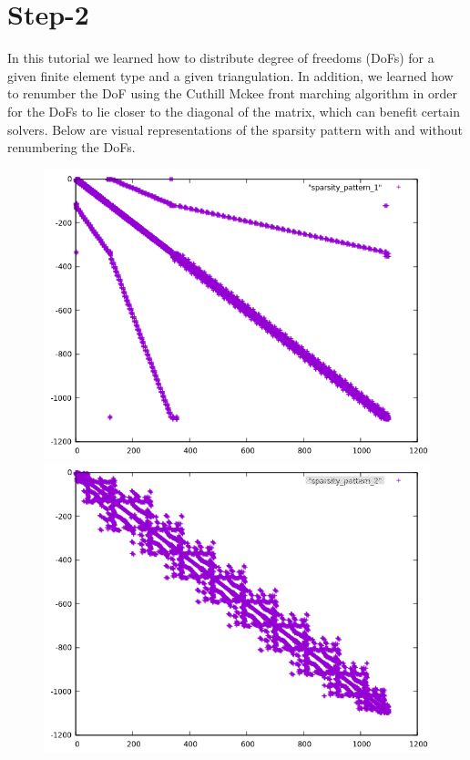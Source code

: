 \documentclass[11pt,fullpage]{article}
\theoremstyle{lemma}
\theoremstyle{definition}
\theoremstyle{lemma}
\begin{document}
\section*{Step-2}
In this tutorial we learned how to distribute degree of freedoms (DoFs) for a given finite element type and a given triangulation. In addition, we learned how to renumber the DoF using the Cuthill Mckee front marching algorithm in order for the DoFs to lie closer to the diagonal of the matrix, which can benefit certain solvers. Below are visual representations of the sparsity pattern with and without renumbering the DoFs.

\begin{figure}[!ht]
	\begin{minipage}{.4\paperwidth}
		\centering
		\includegraphics[scale=.45]{Step2-1.png}
	\end{minipage}%
	\begin{minipage}{.4\paperwidth}
		\centering
		\includegraphics[scale=.45]{Step2-2.png}
	\end{minipage}
\end{figure}
\end{document}
